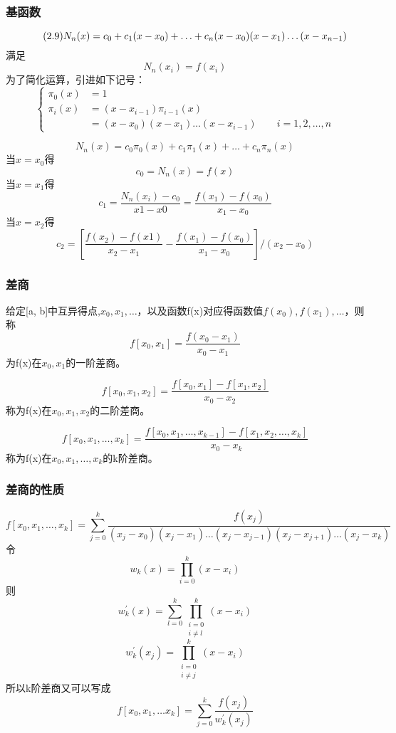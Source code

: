\documentclass[12pt]{article}
\numberwithin{equation}{section}
\begin{document}
	\subsubsection{基函数}
	\begin{equation} \tag{2.9} \label{2.9}
		\notag
		N_n(x) = c_0 + c_1 (x - x_0) + \ldots + c_n (x - x_0)(x - x_1) \ldots (x - x_{n-1})
	\end{equation}
	满足
	$$
	N_n(x_i) = f(x_i)
	$$
	为了简化运算，引进如下记号：
	\begin{equation} \tag{2.10} \label{2.10}
		\begin{cases}
			\pi_0(x) &= 1 \\
			\pi_i(x) &= (x - x_{i-1}) \pi_{i-1}(x) \\
			&= (x - x_0)(x - x_1) \ldots (x - x_{i-1}) \quad \quad i=1, 2, \ldots , n
		\end{cases}
	\end{equation}
	
	$$
	N_n(x) = c_0 \pi_0(x) + c_1 \pi_1(x) + \ldots + c_n \pi_n(x)
	$$
	当$x = x_0$得
	$$
	c_0 = N_n(x) = f(x)
	$$
	当$x = x_1$得
	$$
	c_1 = \frac{N_n(x_i) - c_0}{x1 - x0} = \frac{f(x_1) - f(x_0)}{x_1 - x_0}
	$$
	当$x = x_2$得
	$$
	c_2 = \left[\frac{f(x_2) - f(x1)}{x_2 - x_1} - \frac{f(x_1) - f(x_0)}{x_1 - x_0}  \right]/(x_2 - x_0) 
	$$

	\subsubsection{差商}
	给定[a, b]中互异得点,$x_0, x_1, \ldots $，以及函数f(x)对应得函数值$f(x_0), f(x_1), \ldots$，则称
	$$
	f[x_0, x_1]=\frac{f(x_0 - x_1)}{x_0 - x_1}
	$$
	为f(x)在$x_0, x_1$的一阶差商。

	$$
	f[x_0, x_1, x_2] = \frac{f[x_0, x_1] - f[x_1, x_2]}{x_0 - x_2}
	$$
	称为f(x)在$x_0, x_1, x_2$的二阶差商。

	$$
	f[x_0, x_1, \ldots , x_k] = \frac{f[x_0, x_1, \ldots , x_{k-1}] - f[x_1, x_2, \ldots , x_k]}{x_0 - x_k}
	$$
	称为f(x)在$x_0, x_1, \ldots , x_k$的k阶差商。

	\subsubsection{差商的性质}
	$$
	f[x_0, x_1, \ldots , x_k] = \sum_{j=0}^k \frac{f(x_j)}{(x_j - x_0)(x_j - x_1)\ldots (x_j - x_{j-1})(x_j - x_{j+1})\ldots (x_j - x_k)}
	$$
	令
	$$
	w_k(x) = \prod_{i=0}^k (x - x_i)
	$$
	则
	$$
	w_k^\prime(x) = \sum_{l=0}^k \prod_{\substack{i=0 \\ i \neq l}}^k (x - x_i)
	$$
	$$
	w_k^\prime(x_j) = \prod_{\substack{i=0 \\ i \neq j}}^k (x - x_i)
	$$
	所以k阶差商又可以写成
	$$
	f[x_0, x_1, \ldots x_k] = \sum_{j=0}^k \frac{f(x_j)}{w_{k}^\prime(x_j)}
	$$
\end{document}
